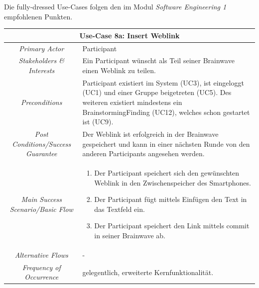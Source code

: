 Die fully-dressed Use-Cases folgen den im Modul \textit{Software Engineering 1} empfohlenen Punkten.
\renewcommand{\arraystretch}{1.35}
\begin{center}
	\begin{longtable}{| c | p{7cm} |}
		\hline
		\multicolumn{2}{|c|}{\textbf{Use-Case 8a: Insert Weblink}}\\
		\hline\hline
		\textit{Primary Actor} & Participant\\
		\hline
		\textit{Stakeholders \& Interests} & Ein Participant wünscht als Teil seiner Brainwave einen Weblink zu teilen. \\
		\hline
		\textit{Preconditions} & Participant existiert im System (UC3), ist eingeloggt (UC1) und einer Gruppe beigetreten (UC5). Des weiteren existiert mindestens ein BrainstormingFinding (UC12), welches schon gestartet ist (UC9).\\
		\hline
		\textit{Post Conditions/Success Guarantee} & Der Weblink ist erfolgreich in der Brainwave gespeichert und kann in einer nächsten Runde von den anderen Participants angesehen werden.\\
		\hline
		\textit{Main Success Scenario/Basic Flow} & 
		\begin{enumerate}[noitemsep]
			\item Der Participant speichert sich den gewünschten Weblink in den Zwischenspeicher des Smartphones.
			\item Der Participant fügt mittels Einfügen den Text in das Textfeld ein.
			\item Der Participant speichert den Link mittels commit in seiner Brainwave ab.
		\end{enumerate}\\
		\hline
		\textit{Alternative Flows} &
		-\\
		\hline
		\textit{Frequency of Occurrence} & gelegentlich, erweiterte Kernfunktionalität.\\
		\hline
	\end{longtable}
\end{center}

